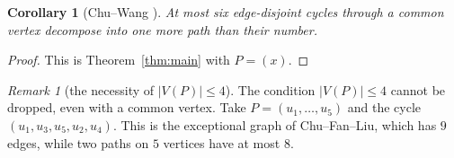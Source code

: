 \documentclass[11pt]{amsart}
\newtheorem{corollary}[theorem]{Corollary}
\theoremstyle{definition}
\theoremstyle{remark}
\newtheorem{remark}[theorem]{Remark}
\begin{document}
\begin{corollary}[Chu--Wang {\cite[Lemma 2.3]{CW}}]\label{cor:six}
At most six edge-disjoint cycles through a common vertex decompose into one more path than their
number.
\end{corollary}

\begin{proof}
This is Theorem~\ref{thm:main} with $P=(x)$.
\end{proof}

\begin{remark}[the necessity of $|V(P)|\le 4$]
The condition $|V(P)|\le 4$ cannot be dropped, even with a common vertex. Take $P=(u_1,\dots,u_5)$
and the cycle $(u_1,u_3,u_5,u_2,u_4)$. This is the exceptional graph of Chu--Fan--Liu, which has
$9$ edges, while two paths on $5$ vertices have at most $8$.
\end{remark}
\end{document}
